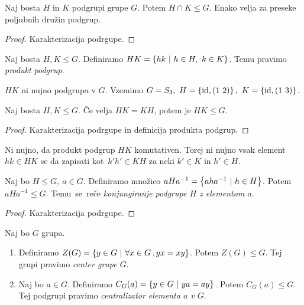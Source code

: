 \newpage
\begin{trditev}
    Naj bosta $H$ in $K$ podgrupi grupe $G$. Potem $H \cap K \leq G$. Enako velja za preseke poljubnih družin podgrup.
\end{trditev}

\begin{proof}
    Karakterizacija podrgupe.
\end{proof}

\begin{definicija}
    Naj bosta $H, K \leq G$. Definiramo $HK = \left\{hk \ | \ h \in H, \ k \in K\right\}$. Temu pravimo \emph{produkt podgrup}.
\end{definicija}

\begin{zgled}
    $H K$ ni nujno podgrupa v $G$. Vzemimo $G = S_3, \ H =\left\{\operatorname{id}, (1\ 2)\right\}, \ K = \left\{\operatorname{id}, (1\ 3)\right\}$.
\end{zgled}

\begin{trditev}
    Naj bosta $H, K \leq G$. Če velja $HK = KH$, potem je $HK \leq G$.
\end{trditev}

\begin{proof}
    Karakterizacija podrgupe in definicija produkta podgrup.
\end{proof}

\begin{opomba}
    Ni nujno, da produkt podgrup $HK$ komutativen. Torej ni nujno vsak element $hk \in HK$ se da zapisati kot~$k'h' \in KH$ za neki $k' \in K$ in $h' \in H$.
\end{opomba}

\begin{definicija}
    Naj bo $H \leq G, \ a \in G$. Definiramo množico $aHa^{-1} = \left\{aha^{-1} \ | \ h \in H\right\}$. Potem $aHa^{-1} \leq G$. Temu~se~reče \emph{konjungiranje podgrupe $H$ z elementom $a$}.
\end{definicija}

\begin{proof}
    Karakterizacija podrgupe.
\end{proof}

\begin{trditev}
    Naj bo $G$ grupa.
    \begin{enumerate}
        \item Definiramo $Z(G) = \left\{y \in G \ | \ \forall x \in G \,.\, yx=xy\right\}$. Potem $Z(G) \leq G$. Tej grupi pravimo \emph{center grupe $G$}.
        \item Naj bo $a \in G$. Definiramo $C_G(a) = \left\{y \in G \ | \ ya = ay\right\}$. Potem $C_G(a) \leq G$. Tej podgrupi pravimo \emph{centralizator elementa $a$ v $G$}.
    \end{enumerate}
\end{trditev}


